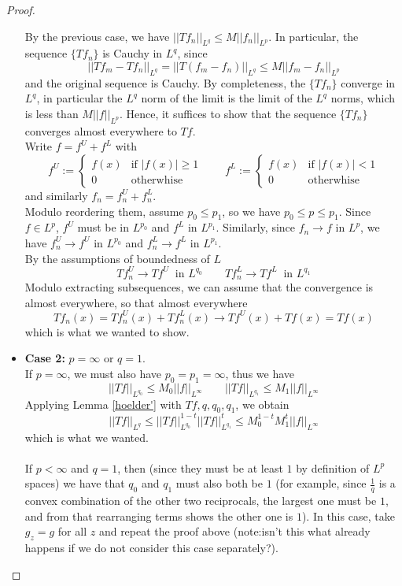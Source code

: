 \begin{proof}
\begin{itemize}
{\begin{itemize}
{            By the previous case, we have $||Tf_n||_{L^q} \leq M ||f_n||_{L^p}$. In particular, the sequence $\{Tf_n\}$ is Cauchy in $L^q$, since
            \[ ||Tf_m - Tf_n||_{L^q} = ||T(f_m-f_n)||_{L^q} \leq M ||f_m - f_n||_{L^p} \]
            and the original sequence is Cauchy. By completeness, the $\{Tf_n\}$ converge in $L^q$, in particular the $L^q$ norm of the limit is the limit of the $L^q$ norms, which is less than $M ||f||_{L^p}$.
            Hence, it suffices to show that the sequence $\{Tf_n\}$ converges almost everywhere to $Tf$.\\
            Write $f= f^U + f^L$ with
            \[ f^U := \begin{cases} f(x) & \text{if } |f(x)|\geq 1 \\ 0 & \text{otherwhise} \end{cases} \qquad f^L := \begin{cases} f(x) & \text{if } |f(x)|< 1 \\ 0 & \text{otherwhise} \end{cases}  \]
            and similarly $f_n = f_n^U + f_n^L$.\\
            Modulo reordering them, assume $p_0 \leq p_1$, so we have $p_0 \leq p \leq p_1$. Since $f\in L^p$, $f^U$ must be in $L^{p_0}$ and $f^L$ in $L^{p_1}$.
            Similarly, since $f_n \to f$ in $L^p$, we have $f_n^U \to f^U$ in $L^{p_0}$ and $f_n^L \to f^L$ in $L^{p_1}$.\\
            By the assumptions of boundedness of $L$
            \[ Tf_n^U \to Tf^U \ \text{ in } L^{q_0} \qquad Tf_n^L \to Tf^L \ \text{ in } L^{q_1} \]
            Modulo extracting subsequences, we can assume that the convergence is almost everywhere, so that almost everywhere
            \[ Tf_n (x) = Tf_n^U (x) + Tf_n^L(x) \to Tf^U (x) + Tf(x) = Tf (x)\]
            which is what we wanted to show.
            }
        \end{itemize}
        }
        \item{\textbf{Case 2:} $p=\infty$ or $q=1$.\\
        If $p=\infty$, we must also have $p_0=p_1=\infty$, thus we have
        \[ ||Tf||_{L^{q_0}} \leq M_0 ||f||_{L^{\infty}} \qquad ||Tf||_{L^{q_1}} \leq M_1 ||f||_{L^{\infty}} \]
        Applying Lemma \ref{hoelder'} with $Tf, q, q_0, q_1$, we obtain
        \[||Tf||_{L^q} \leq ||Tf||_{L^{q_0}}^{1-t} ||Tf||_{L^{q_1}}^{t} \leq  M_0^{1-t} M_1^t ||f||_{L^{\infty}} \]
        which is what we wanted.\\\\
        If $p<\infty$ and $q=1$, then (since they must be at least $1$ by definition of $L^p$ spaces) we have that $q_0$ and $q_1$ must also both be $1$ (for example, since $\frac{1}{q}$ is a convex combination of the other two reciprocals, the largest one must be $1$, and from that rearranging terms shows the other one is $1$).
        In this case, take $g_z=g$ for all $z$ and repeat the proof above (note:isn't this what already happens if we do not consider this case separately?).
        }

      \end{itemize}


  \end{proof}

